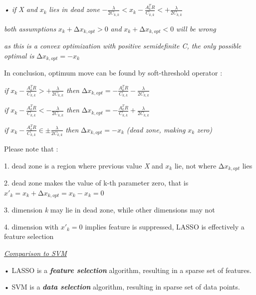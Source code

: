 \emph{• if X and} \(x_{k}\) \emph{lies in dead zone}
\(- \frac{\lambda}{2C_{k,k}} < x_{k} - \frac{A_{k}^{T}R}{C_{k,k}} < + \frac{\lambda}{2C_{k,k}}\)

\emph{both assumptions} \(x_{k} + {\mathrm{\Delta}x}_{k,opt} > 0\)
\emph{and} \(x_{k} + {\mathrm{\Delta}x}_{k,opt} < 0\) \emph{will be
wrong}

\emph{as this is a convex optimization with positive semidefinite C, the
only possible optimal is} \({\mathrm{\Delta}x}_{k,opt} = - x_{k}\)

In conclusion, optimum move can be found by soft-threshold operator :

\emph{if}
\(x_{k} - \frac{A_{k}^{T}R}{C_{k,k}} > + \frac{\lambda}{2C_{k,k}}\)
\emph{then}
\({\mathrm{\Delta}x}_{k,opt} = - \frac{A_{k}^{T}R}{C_{k,k}} - \frac{\lambda}{2C_{k,k}}\)

\emph{if}
\(x_{k} - \frac{A_{k}^{T}R}{C_{k,k}} < - \frac{\lambda}{2C_{k,k}}\)
\emph{then}
\({\mathrm{\Delta}x}_{k,opt} = - \frac{A_{k}^{T}R}{C_{k,k}} + \frac{\lambda}{2C_{k,k}}\)

\emph{if}
\(x_{k} - \frac{A_{k}^{T}R}{C_{k,k}} \in \pm \frac{\lambda}{2C_{k,k}}\)
\emph{then} \({\mathrm{\Delta}x}_{k,opt} = - x_{k}\) \emph{(dead zone,
making} \(x_{k}\) \emph{zero)}

Please note that :

1. dead zone is a region where previous value \emph{X} and \(x_{k}\)
lie, not where \({\mathrm{\Delta}x}_{k,opt}\) lies

2. dead zone makes the value of k-th parameter zero, that is
\({x'}_{k} = x_{k} + {\mathrm{\Delta}x}_{k,opt} = x_{k} - x_{k} = 0\)

3. dimension \emph{k} may lie in dead zone, while other dimensions may
not

4. dimension with \({x'}_{k} = 0\) implies feature is suppressed, LASSO
is effectively a feature selection

\emph{\ul{Comparison to SVM}}

• LASSO is a \emph{\textbf{feature selection}} algorithm, resulting in a
sparse set of features.

• SVM is a \emph{\textbf{data selection}} algorithm, resulting in sparse
set of data points.
